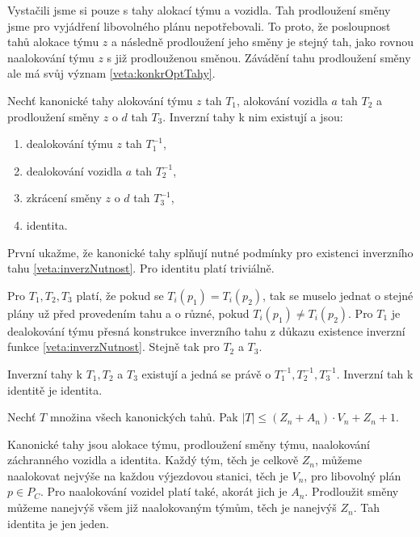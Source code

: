 Vystačili jsme si pouze s tahy alokací týmu a vozidla.
Tah prodloužení směny jsme pro vyjádření libovolného plánu nepotřebovali.
To proto, že posloupnost tahů alokace týmu $z$ a následně prodloužení jeho směny je stejný tah, jako rovnou naalokování týmu $z$ s již prodlouženou směnou.
Závádění tahu prodloužení směny ale má svůj význam \ref{veta:konkrOptTahy}.

\begin{veta}\label{veta:invKanTahy}
  Nechť kanonické tahy alokování týmu $z$ tah $T_1$, alokování vozidla $a$ tah $T_2$ a prodloužení směny $z$ o $d$ tah $T_3$.
  Inverzní tahy k nim existují a jsou:

  \begin{enumerate}
    \item
      dealokování týmu $z$ tah $T_1^{-1}$,

    \item
      dealokování vozidla $a$ tah $T_2^{-1}$,

    \item
      zkrácení směny $z$ o $d$ tah $T_3^{-1}$,

    \item
      identita.
  \end{enumerate}
\end{veta}
\begin{dukaz}
  První ukažme, že kanonické tahy splňují nutné podmínky pro existenci inverzního tahu \ref{veta:inverzNutnost}.
  Pro identitu platí triviálně.

  Pro $T_1, T_2, T_3$ platí, že pokud se $T_i(p_1) = T_i(p_2)$, tak se muselo jednat o stejné plány už před provedením tahu a o různé, pokud $T_i(p_1) \neq T_i(p_2)$.
  Pro $T_1$ je dealokování týmu přesná konstrukce inverzního tahu z důkazu existence inverzní funkce \ref{veta:inverzNutnost}.
  Stejně tak pro $T_2$ a $T_3$.

  Inverzní tahy k $T_1, T_2$ a $T_3$ existují a jedná se právě o $T_1^{-1}, T_2^{-1}, T_3^{-1}$.
  Inverzní tah k identitě je identita.
\end{dukaz}

\begin{veta}\label{veta:pocetKanTahu}
  Nechť $T$ množina všech kanonických tahů. Pak $|T| \leq (Z_n + A_n) \cdot V_n + Z_n + 1$.
\end{veta}
\begin{dukaz}
  Kanonické tahy jsou alokace týmu, prodloužení směny týmu, naalokování záchranného vozidla a identita.
  Každý tým, těch je celkově $Z_n$, můžeme naalokovat nejvýše na každou výjezdovou stanici, těch je $V_n$, pro libovolný plán $p \in P_C$.
  Pro naalokování vozidel platí také, akorát jich je $A_n$.
  Prodloužit směny můžeme nanejvýš všem již naalokovaným týmům, těch je nanejvýš $Z_n$.
  Tah identita je jen jeden.
\end{dukaz}

